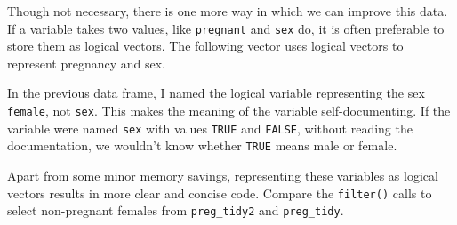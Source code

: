 \documentclass[]{book}
\newenvironment{Shaded}{\begin{snugshade}}{\end{snugshade}}
\newcommand{\CommentTok}[1]{\textcolor[rgb]{0.56,0.35,0.01}{\textit{#1}}}
\newcommand{\DataTypeTok}[1]{\textcolor[rgb]{0.13,0.29,0.53}{#1}}
\newcommand{\KeywordTok}[1]{\textcolor[rgb]{0.13,0.29,0.53}{\textbf{#1}}}
\newcommand{\NormalTok}[1]{#1}
\newcommand{\OperatorTok}[1]{\textcolor[rgb]{0.81,0.36,0.00}{\textbf{#1}}}
\newcommand{\OtherTok}[1]{\textcolor[rgb]{0.56,0.35,0.01}{#1}}
\newcommand{\StringTok}[1]{\textcolor[rgb]{0.31,0.60,0.02}{#1}}
\theoremstyle{plain}
\theoremstyle{remark}
\begin{document}
\begin{Shaded}
\end{Shaded}

Though not necessary, there is one more way in which we can improve this
data. If a variable takes two values, like \texttt{pregnant} and
\texttt{sex} do, it is often preferable to store them as logical
vectors. The following vector uses logical vectors to represent
pregnancy and sex.

\begin{Shaded}
\end{Shaded}

In the previous data frame, I named the logical variable representing
the sex \texttt{female}, not \texttt{sex}. This makes the meaning of the
variable self-documenting. If the variable were named \texttt{sex} with
values \texttt{TRUE} and \texttt{FALSE}, without reading the
documentation, we wouldn't know whether \texttt{TRUE} means male or
female.

Apart from some minor memory savings, representing these variables as
logical vectors results in more clear and concise code. Compare the
\texttt{filter()} calls to select non-pregnant females from
\texttt{preg\_tidy2} and \texttt{preg\_tidy}.
\end{document}
